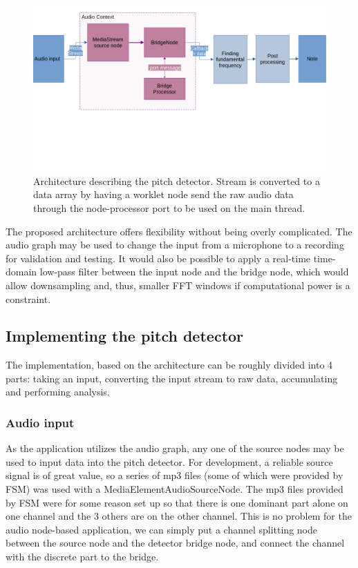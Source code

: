 \begin{figure}[ht]
    \centering
    \includegraphics[width=\textwidth]{./images/pdArchitecture.png}
    \caption{Architecture describing the pitch detector. Stream is converted to a data array by having a worklet node send the raw audio data through the node-processor port to be used on the main thread.\label{fig:pdArch}}
\end{figure}

The proposed architecture offers flexibility without being overly complicated. The audio graph may be used to change the input from a microphone to a recording for validation and testing. It would also be possible to apply a real-time time-domain low-pass filter between the input node and the bridge node, which would allow downsampling and, thus, smaller FFT windows if computational power is a constraint. 

\subsection{Implementing the pitch detector}
The implementation, based on the architecture can be roughly divided into 4 parts: taking an input, converting the input stream to raw data, accumulating and performing analysis.

\subsubsection{Audio input}
As the application utilizes the audio graph, any one of the source nodes may be used to input data into the pitch detector. For development, a reliable source signal is of great value, so a series of mp3 files (some of which were provided by FSM) was used with a MediaElementAudioSourceNode. The mp3 files provided by FSM were for some reason set up so that there is one dominant part alone on one channel and the 3 others are on the other channel. This is no problem for the audio node-based application, we can simply put a channel splitting node between the source node and the detector bridge node, and connect the channel with the discrete part to the bridge.


